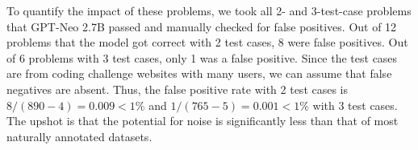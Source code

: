 To quantify the impact of these problems, we took all 2- and 3-test-case problems that GPT-Neo 2.7B passed and manually checked for false positives. Out of 12 problems that the model got correct with 2 test cases, 8 were false positives. Out of 6 problems with 3 test cases, only 1 was a false positive. Since the test cases are from coding challenge websites with many users, we can assume that false negatives are absent. Thus, the false positive rate with 2 test cases is $8/(890-4) = 0.009 < 1\%$ and $1/(765-5) = 0.001 < 1\%$ with 3 test cases. The upshot is that the potential for noise is significantly less than that of most naturally annotated datasets.